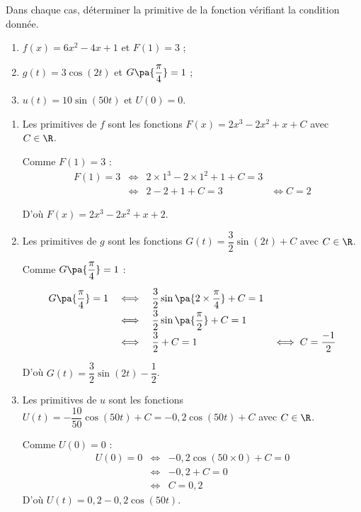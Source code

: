 \begin{methode}
	Dans chaque cas, déterminer la primitive de la fonction vérifiant la condition donnée.

	\begin{enumerate}
		\item $f(x) = 6x^2 - 4x + 1$ et $F(1) = 3$ ;
		\item $g(t) = 3\cos(2t)$ et $G\pa{\dfrac{\pi}{4}} = 1$ ;
		\item $u(t) = 10\sin(50t)$ et $U(0) = 0$.
	\end{enumerate}

	\begin{correction}
		\nline
		\begin{enumerate}
			\item Les primitives de $f$ sont les fonctions $F(x) = 2x^3 - 2x^2 + x + C$ avec $C \in \R$.

			      Comme $F(1) = 3$ :
			      \[
				      \begin{array}{rcll}
					      F(1) = 3 & \iff & 2\times 1^3 - 2\times 1^2 + 1 + C = 3 &             \\
					               & \iff & 2 - 2 + 1 + C = 3                     & \iff  C = 2
				      \end{array}
			      \]

			      D'où $F(x) = 2x^3 - 2x^2 + x + 2$.

			\item Les primitives de $g$ sont les fonctions $G(t) = \dfrac{3}{2}\sin(2t) + C$ avec $C \in \R$.

			      Comme $G\pa{\dfrac{\pi}{4}} = 1$ :
			      \[
				      \def\arraystretch{1.8}
				      \begin{array}{rcll}
					      G\pa{\dfrac{\pi}{4}} = 1 & \iff & \dfrac{3}{2}\sin\pa{2\times \dfrac{\pi}{4}} + C = 1 &                         \\
					                               & \iff & \dfrac{3}{2}\sin\pa{\dfrac{\pi}{2}} + C = 1         &                         \\
					                               & \iff & \dfrac{3}{2} + C = 1                                & \iff  C = \dfrac{-1}{2}
				      \end{array}
			      \]

			      D'où $G(t) = \dfrac{3}{2}\sin(2t) - \dfrac{1}{2}$.
			\item Les primitives de $u$ sont les fonctions $U(t) = -\dfrac{10}{50}\cos(50t) + C = -0{,}2\cos(50t) + C$ avec $C \in \R$.

			      Comme $U(0) = 0$ :
			      \[
				      \begin{array}{rcl}
					      U(0) = 0 & \iff & -0{,}2\cos(50\times 0) + C = 0 \\
					               & \iff & -0{,}2 + C = 0                 \\
					               & \iff & C = 0{,}2
				      \end{array}
			      \]
			      D'où $U(t) = 0{,}2 - 0{,}2\cos(50t)$.
		\end{enumerate}
	\end{correction}
\end{methode}

